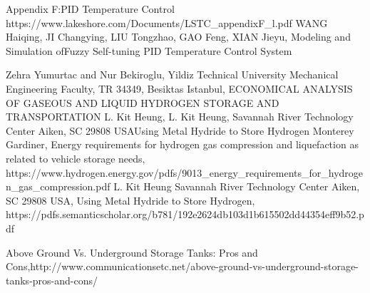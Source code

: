 \begin{thebibliography}{99}
Appendix F:PID Temperature Control https://www.lakeshore.com/Documents/LSTC\_appendixF\_l.pdf
WANG Haiqing, JI Changying, LIU Tongzhao, GAO Feng, XIAN Jieyu, Modeling and Simulation ofFuzzy Self-tuning PID Temperature Control System


Zehra Yumurtac and Nur Bekiroglu, Yildiz Technical University Mechanical Engineering Faculty, TR 34349, Besiktas Istanbul, ECONOMICAL
ANALYSIS OF GASEOUS AND LIQUID HYDROGEN STORAGE AND TRANSPORTATION
L. Kit Heung, L. Kit Heung, Savannah River Technology Center Aiken, SC 29808 USAUsing Metal Hydride to Store Hydrogen
Monterey Gardiner, Energy requirements for hydrogen gas compression and liquefaction as related to vehicle storage needs, https://www.hydrogen.energy.gov/pdfs/9013\_energy\_requirements\_for\_hydrogen\_gas\_compression.pdf
L. Kit Heung Savannah River Technology Center Aiken, SC 29808 USA, Using Metal Hydride to Store Hydrogen, https://pdfs.semanticscholar.org/b781/192e2624db103d1b615502dd44354eff9b52.pdf




Above Ground Vs. Underground Storage Tanks: Pros and Cons,http://www.communicationsetc.net/above-ground-vs-underground-storage-tanks-pros-and-cons/










\end{thebibliography}
